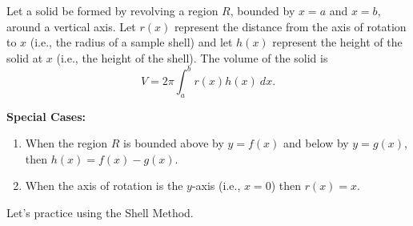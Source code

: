 \bigskip

{Let a solid be formed by revolving a region $R$, bounded by $x=a$ and $x=b$, around a vertical axis. Let $r(x)$ represent the distance from the axis of rotation to $x$ (i.e., the radius of a sample shell) and let $h(x)$ represent the height of the solid at $x$ (i.e., the height of the shell). The volume of the solid is 
\[V = 2\pi\int_a^b r(x)h(x)\ dx.\]
}

\textbf{Special Cases:}
	\begin{enumerate}
	\item		When the region $R$ is bounded above by $y=f(x)$ and below by $y=g(x)$, then $h(x) = f(x)-g(x)$.
	\item		When the axis of rotation is the $y$-axis (i.e., $x=0$) then $r(x) = x$.
	\end{enumerate}


Let's practice using the Shell Method.

